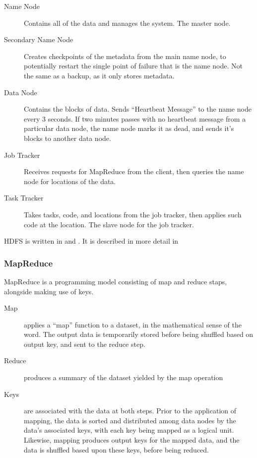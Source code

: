 \begin{description}

    \item[Name Node]
        Contains all of the data and manages the system. The master node.
    \item[Secondary Name Node]
        Creates checkpoints of the metadata from the main name node, to
        potentially restart the single point of failure that is the name node.
        Not the same as a backup, as it only stores metadata.
    \item[Data Node]
        Contains the blocks of data. Sends ``Heartbeat Message'' to the name
        node every 3 seconds. If two minutes passes with no heartbeat message
        from a particular data node, the name node marks it as dead, and sends
        it's blocks to another data node.
    \item[Job Tracker]
        Receives requests for MapReduce from the client, then queries the name
        node for locations of the data.
    \item[Task Tracker]
        Takes tasks, code, and locations from the job tracker, then applies such
        code at the location. The slave node for the job tracker.
\end{description}

HDFS is written in  and . It is described in more detail in \cite{shvachko2010hadoop}

\subsubsection{MapReduce}\label{sec:mapreduce}

MapReduce is a programming model consisting of map and reduce staps,
alongside making use of keys.

\begin{description}

    \item[Map]
        applies a ``map'' function to a dataset, in the mathematical sense of
        the word. The output data is temporarily stored before being shuffled
        based on output key, and sent to the reduce step.
    \item[Reduce]
        produces a summary of the dataset yielded by the map operation
    \item[Keys]
        are associated with the data at both steps. Prior to the application of
        mapping, the data is sorted and distributed among data nodes by the
        data's associated keys, with each key being mapped as a logical unit.
        Likewise, mapping produces output keys for the mapped data, and the data
        is shuffled based upon these keys, before being reduced.
\end{description}

